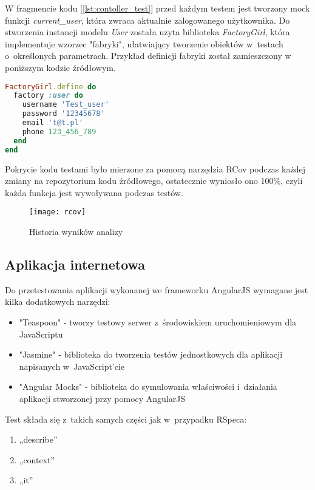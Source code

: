 \documentclass[eng,archivemode]{mgr}
\begin{document}
W fragmencie kodu [\ref{lst:contoller_test}] przed każdym testem jest tworzony mock funkcji \textit{current\_user}, która zwraca aktualnie zalogowanego użytkownika. Do stworzenia instancji modelu \textit{User} została użyta biblioteka \textit{FactoryGirl}, która implementuje wzorzec "fabryki", ułatwiający tworzenie obiektów w~testach o~określonych parametrach. Przykład definicji fabryki został zamieszczony w poniższym kodzie źródłowym.

\begin{lstlisting}[language=ruby, caption={Fabryka do tworzenia obiektu typu "User"}]
FactoryGirl.define do
  factory :user do
    username 'Test_user'
    password '12345678'
    email 't@t.pl'
    phone 123_456_789
  end
end
\end{lstlisting}
\newpage
Pokrycie kodu testami było mierzone za pomocą narzędzia RCov podczas każdej zmiany na repozytorium kodu źródłowego, ostatecznie wyniosło ono 100\%, czyli każda funkcja jest wywoływana podczas testów.
\begin{figure}[H]
	\centering
	\texttt{[image: rcov]}
	\caption{Historia wyników analizy}
	\label{fig:rcov}
\end{figure}
\subsection{Aplikacja internetowa}
Do przetestowania aplikacji wykonanej we frameworku AngularJS wymagane jest kilka dodatkowych narzędzi:
\begin{itemize}
	\item "Teaspoon" - tworzy testowy serwer z~środowiskiem uruchomieniowym dla JavaScriptu
	\item "Jasmine" - biblioteka do tworzenia testów jednostkowych dla aplikacji napisanych w~JavaScript'cie
	\item "Angular Mocks" - biblioteka do symulowania właściwości i~działania aplikacji stworzonej przy pomocy AngularJS
\end{itemize}
Test składa się z~takich samych części jak w~przypadku RSpeca:
\begin{enumerate}
	\item „describe”
	\item „context”
	\item „it”
\end{enumerate}
\end{document}
